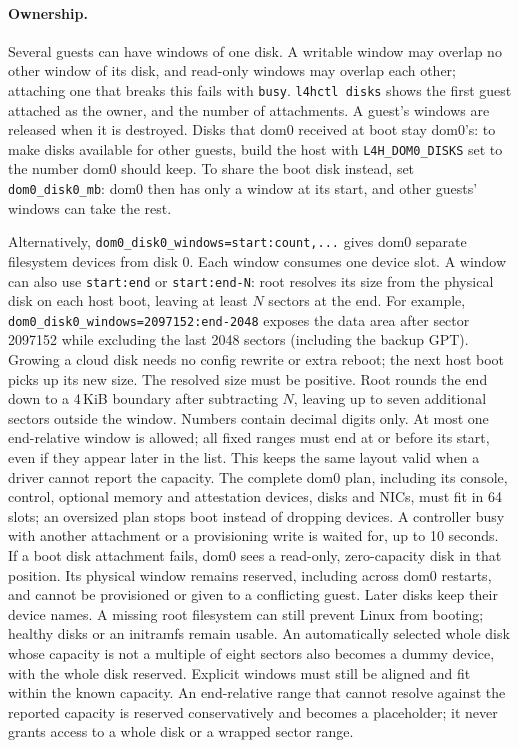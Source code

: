 \documentclass[11pt,a4paper]{report}
\newcommand{\cmd}[1]{\texttt{#1}}
\begin{document}
\paragraph{Ownership.} Several guests can have windows of one disk. A
writable window may overlap no other window of its disk, and read-only
windows may overlap each other; attaching one that breaks this fails with
\texttt{busy}. \cmd{l4hctl disks} shows the first guest attached as the
owner, and the number of attachments. A guest's windows are released when it
is destroyed. Disks that dom0 received at boot stay dom0's: to make
disks available for other guests, build the host with
\texttt{L4H\_DOM0\_DISKS} set to the number dom0 should keep. To share the
boot disk instead, set \texttt{dom0\_disk0\_mb}: dom0 then has only a window
at its start, and other guests' windows can take the rest.

Alternatively, \texttt{dom0\_disk0\_windows=start:count,...} gives dom0
separate filesystem devices from disk 0. Each window consumes one device
slot. A window can also use \texttt{start:end} or
\texttt{start:end-N}: root resolves its size from the physical disk on
each host boot, leaving at least $N$ sectors at the end. For example,
\texttt{dom0\_disk0\_windows=2097152:end-2048} exposes the data area
after sector 2097152 while excluding the last 2048 sectors (including
the backup GPT). Growing a cloud disk needs no config rewrite or extra
reboot; the next host boot picks up its new size. The resolved size must
be positive. Root rounds the end down to a 4\,KiB boundary after
subtracting $N$, leaving up to seven additional sectors outside the
window. Numbers contain decimal digits only. At most one end-relative
window is allowed; all fixed ranges must end at or before its start,
even if they appear later in the list. This keeps the same layout valid
when a driver cannot report the capacity.
The complete dom0 plan, including its console, control, optional
memory and attestation devices, disks and NICs, must fit in 64 slots;
an oversized plan stops boot instead of dropping devices.
A controller busy with another attachment or a provisioning write is
waited for, up to 10 seconds.
If a boot disk attachment fails, dom0 sees a read-only, zero-capacity disk
in that position. Its physical window remains reserved, including across
dom0 restarts, and cannot be provisioned or given to a conflicting guest.
Later disks keep their device names. A missing root filesystem can still
prevent Linux from booting; healthy disks or an initramfs remain usable.
An automatically selected whole disk whose capacity is not a multiple of
eight sectors also becomes a dummy device, with the whole disk reserved.
Explicit windows must still be aligned and fit within the known capacity.
An end-relative range that cannot resolve against the reported capacity
is reserved conservatively and becomes a placeholder; it never grants
access to a whole disk or a wrapped sector range.
\end{document}
